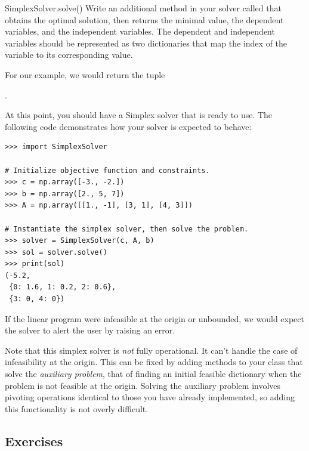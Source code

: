 \begin{problem}{SimplexSolver.solve()}
Write an additional method in your solver called  that obtains the optimal solution, then returns the minimal value, the dependent variables, and the independent variables.
The dependent and independent variables should be represented as two dictionaries that map the index of the variable to its corresponding value.

For our example, we would return the tuple 

.
\end{problem}

\vspace{5mm}

At this point, you should have a Simplex solver that is ready to use.
The following code demonstrates how your solver is expected to behave:

\vspace{5mm}

\begin{lstlisting}
>>> import SimplexSolver

# Initialize objective function and constraints.
>>> c = np.array([-3., -2.])
>>> b = np.array([2., 5, 7])
>>> A = np.array([[1., -1], [3, 1], [4, 3]])

# Instantiate the simplex solver, then solve the problem.
>>> solver = SimplexSolver(c, A, b)
>>> sol = solver.solve()
>>> print(sol)
(-5.2,
 {0: 1.6, 1: 0.2, 2: 0.6},
 {3: 0, 4: 0})
\end{lstlisting}

If the linear program were infeasible at the origin or unbounded, we would expect the solver to alert the user by raising an error.

Note that this simplex solver is \emph{not} fully operational.
It can't handle the case of infeasibility at the origin.
This can be fixed by adding methods to your class that solve the \emph{auxiliary problem}, that of finding an initial feasible dictionary when the problem is not feasible at the origin.
Solving the auxiliary problem involves pivoting operations identical to those you have already implemented, so adding this functionality
is not overly difficult.


\subsection{Exercises}

